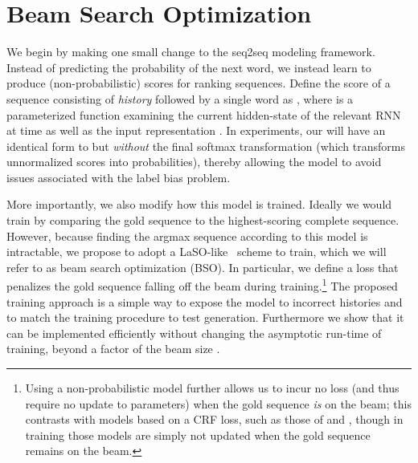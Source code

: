 \documentclass[11pt,letterpaper]{article}
\begin{document}
  





























 
\section{Beam Search Optimization}
We begin by making one small change to the seq2seq modeling
framework. Instead of predicting the probability of the next
word, we instead learn to produce (non-probabilistic) scores
for ranking sequences. Define the score of a sequence consisting of 
\textit{history}  followed by a single word  as ,
where  is a parameterized function examining the current
hidden-state of the relevant RNN at time  as well as the input
representation . In experiments, our  will have an identical 
form to  but \textit{without} the final softmax transformation (which transforms unnormalized scores into probabilities),  thereby allowing the model to avoid issues associated with the label bias
problem.







More importantly, we also modify how this model is
trained. Ideally we would train by comparing the gold sequence to the
highest-scoring complete sequence. However, because finding the
argmax sequence according to this model is intractable, we
propose to adopt a LaSO-like~\cite{daume05learning} scheme to train, which we will refer to as beam search optimization (BSO). In particular, we define a loss that
penalizes the gold sequence falling off the beam during
training.\footnote{Using a non-probabilistic model further allows us
  to incur no loss (and thus require no update to parameters) when the
  gold sequence \textit{is} on the beam; this contrasts with models
  based on a CRF loss, such as those of  and
  , though in training those models are simply not
  updated when the gold sequence remains on the beam.} The proposed
training approach is a simple way to expose the model to incorrect
histories and to match the training procedure to test
generation. Furthermore we show that it can be implemented efficiently
without changing the asymptotic run-time of training, beyond a factor
of the beam size .
\end{document}
